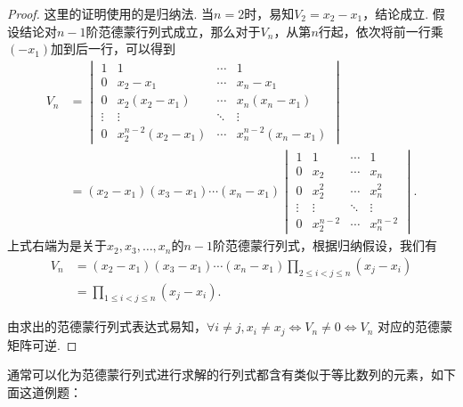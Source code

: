 \begin{proof}
    这里的证明使用的是归纳法. 当$n=2$时，易知$V_2=x_2-x_1$，结论成立. 假设结论对$n-1$阶范德蒙行列式成立，那么对于$V_n$，从第$n$行起，依次将前一行乘$(-x_1)$加到后一行，可以得到\begin{align*}
        V_n & = \begin{vmatrix}
                    1      & 1                  & \cdots & 1                  \\
                    0      & x_2-x_1            & \cdots & x_n-x_1            \\
                    0      & x_2(x_2-x_1)       & \cdots & x_n(x_n-x_1)       \\
                    \vdots & \vdots             & \ddots & \vdots             \\
                    0      & x_2^{n-2}(x_2-x_1) & \cdots & x_n^{n-2}(x_n-x_1)
                \end{vmatrix} \\
            & = (x_2-x_1)(x_3-x_1)\cdots(x_n-x_1)
        \begin{vmatrix}
            1      & 1         & \cdots & 1         \\
            0      & x_2       & \cdots & x_n       \\
            0      & x_2^2     & \cdots & x_n^2     \\
            \vdots & \vdots    & \ddots & \vdots    \\
            0      & x_2^{n-2} & \cdots & x_n^{n-2}
        \end{vmatrix}.
    \end{align*}
    上式右端为是关于$x_2,x_3,\ldots,x_n$的$n-1$阶范德蒙行列式，根据归纳假设，我们有
    \begin{align*}
        V_n & = (x_2-x_1)(x_3-x_1)\cdots(x_n-x_1)\prod_{2 \leqslant i < j \leqslant n}(x_j-x_i) \\
            & = \prod_{1 \leqslant i < j \leqslant n}(x_j-x_i).
    \end{align*}

    由求出的范德蒙行列式表达式易知，$\forall i \neq j, x_i \neq x_j \iff V_n \neq 0 \iff V_n$ 对应的范德蒙矩阵可逆.
\end{proof}

通常可以化为范德蒙行列式进行求解的行列式都含有类似于等比数列的元素，如下面这道例题：

